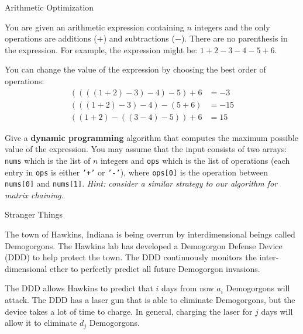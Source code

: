 \documentclass[10pt]{article}
\begin{document}
\soln



\begin{problem}Arithmetic Optimization\end{problem}

You are given an arithmetic expression containing $n$ integers and the only operations are additions ($+$)
and subtractions ($-$). There are no parenthesis in the expression. For example, the expression might be: $1 + 2 - 3 - 4 - 5 + 6$.

You can change the value of the expression by choosing the best order of operations:
\begin{align*}
 ((((1 + 2) - 3) - 4) - 5) + 6 &= -3 \\
 (((1 + 2) - 3) - 4) - (5 + 6) &= -15\\
 ((1 + 2) - ((3 - 4) - 5)) + 6 &= 15
\end{align*}

Give a {\bf dynamic programming} algorithm that computes the maximum possible value of the expression. You may assume that
the input consists of two arrays: \texttt{nums} which is the list of $n$ integers and
\texttt{ops} which is the list of operations (each entry in \texttt{ops} is either \texttt{'+'}
or \texttt{'-'}), where \texttt{ops[0]} is the operation between \texttt{nums[0]} and \texttt{nums[1]}. \emph{Hint: consider a similar strategy to our algorithm for matrix chaining.}

\soln


  

\begin{problem}Stranger Things\end{problem}

The town of Hawkins, Indiana is being overrun by interdimensional beings called Demogorgons. The Hawkins lab has developed a Demogorgon Defense Device (DDD) to help protect the town. The DDD continuously monitors the inter-dimensional ether to perfectly predict all future Demogorgon invasions.

The DDD allows Hawkins to predict that $i$ days from now $a_i$ Demogorgons will attack. The DDD has a laser gun that is able to eliminate Demogorgons, but the device takes a lot of time to charge.  In general, charging the laser for $j$ days will allow it to eliminate $d_j$ Demogorgons.
\end{document}
